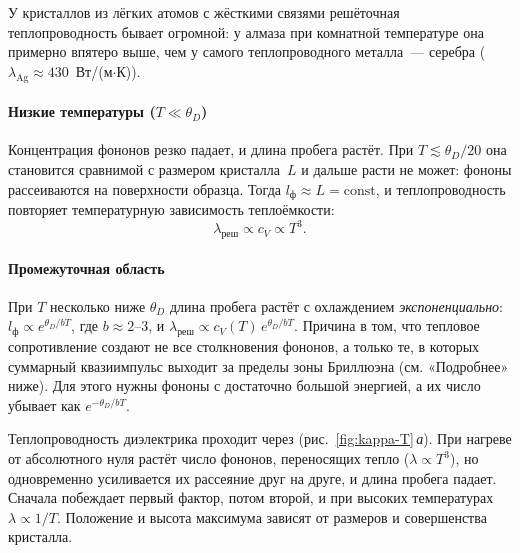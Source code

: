 У кристаллов из лёгких атомов с жёсткими связями решёточная
теплопроводность бывает огромной: у алмаза при комнатной температуре она
примерно впятеро выше, чем у самого теплопроводного металла~— серебра
($\lambda_\text{Ag}\approx430$~Вт/(м$\cdot$К)).

\paragraph{Низкие температуры ($T\ll\theta_D$)}
Концентрация фононов резко падает, и длина пробега растёт. При
$T\lesssim\theta_D/20$ она становится сравнимой с размером кристалла~$L$ и
дальше расти не может: фононы рассеиваются на поверхности образца. Тогда
$l_\text{ф}\approx L=\text{const}$, и теплопроводность повторяет
температурную зависимость теплоёмкости:
\begin{equation}\label{eq:lambda-lowT}
\lambda_\text{реш}\propto c_V\propto T^3 .
\end{equation}

\paragraph{Промежуточная область}
При $T$ несколько ниже $\theta_D$ длина пробега растёт с охлаждением
\emph{экспоненциально}: $l_\text{ф}\propto e^{\theta_D/bT}$, где $b\approx2$--3,
и $\lambda_\text{реш}\propto c_V(T)\,e^{\theta_D/bT}$.
Причина в том, что тепловое сопротивление создают не все столкновения
фононов, а только те, в которых суммарный квазиимпульс выходит за пределы
зоны Бриллюэна (см. «Подробнее» ниже). Для этого нужны фононы с достаточно
большой энергией, а их число убывает как $e^{-\theta_D/bT}$.

\begin{glavnoe}
Теплопроводность диэлектрика проходит через 
(рис.~\ref{fig:kappa-T}\,\textit{а}). При нагреве от абсолютного нуля растёт
число фононов, переносящих тепло ($\lambda\propto T^3$), но одновременно
усиливается их рассеяние друг на друге, и длина пробега падает. Сначала
побеждает первый фактор, потом второй, и при высоких температурах
$\lambda\propto1/T$. Положение и высота максимума зависят от размеров и
совершенства кристалла.
\end{glavnoe}


